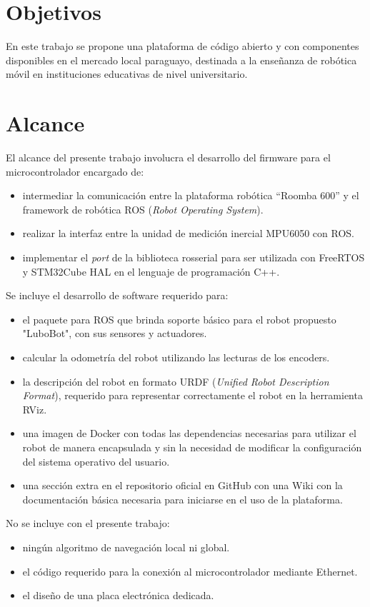 \section{Objetivos}

En este trabajo se propone una plataforma de código abierto y con componentes disponibles en el mercado local paraguayo, destinada a la enseñanza de robótica móvil en instituciones educativas de nivel universitario.

\section{Alcance}

El alcance del presente trabajo involucra el desarrollo del firmware para el microcontrolador encargado de:
\begin{itemize}
	\item intermediar la comunicación entre la plataforma robótica ``Roomba 600'' y el framework de robótica ROS (\textit{Robot Operating System}).
	\item realizar la interfaz entre la unidad de medición inercial MPU6050 con ROS.
	\item implementar el \textit{port} de la biblioteca rosserial para ser utilizada con FreeRTOS y STM32Cube HAL en el lenguaje de programación C++.
\end{itemize}

Se incluye el desarrollo de software requerido para:
\begin{itemize}
	\item el paquete para ROS que brinda soporte básico para el robot propuesto "LuboBot", con sus sensores y actuadores.
	\item calcular la odometría del robot utilizando las lecturas de los encoders.
	\item la descripción del robot en formato URDF (\textit{Unified Robot Description Format}), requerido para representar correctamente el robot en la herramienta RViz.
	\item una imagen de Docker con todas las dependencias necesarias para utilizar el robot de manera encapsulada y sin la necesidad de modificar la configuración del sistema operativo del usuario.
	\item una sección extra en el repositorio oficial en GitHub con una Wiki con la documentación básica necesaria para iniciarse en el uso de la plataforma.
\end{itemize}

No se incluye con el presente trabajo:
\begin{itemize}
	\item ningún algoritmo de navegación local ni global.
	\item el código requerido para la conexión al microcontrolador mediante Ethernet.
	\item el diseño de una placa electrónica dedicada.
\end{itemize}